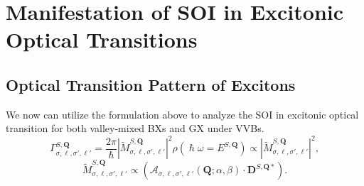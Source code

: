 \section{Manifestation of SOI in Excitonic Optical Transitions}
\subsection{Optical Transition Pattern of Excitons}
We now can utilize the formulation above to analyze the SOI in excitonic optical transition for both valley-mixed BXs and GX under VVBs. 
\begin{equation}
\Gamma_{\sigma, \ell, \sigma', \ell'}^{S, \boldsymbol{Q}}
=
\frac{2\pi}{\hslash} 
\left|
\tilde{M}_{\sigma, \ell, \sigma', \ell'}^{S, \boldsymbol{Q}}
\right|^2
\rho(\hslash\omega=E^{S, \boldsymbol{Q}})
\propto 
\left|
\tilde{M}_{\sigma, \ell, \sigma', \ell'}^{S, \boldsymbol{Q}}
\right|^2,
\end{equation}
\begin{equation}
\tilde{M}_{\sigma, \ell, \sigma', \ell'}^{S, \boldsymbol{Q}}
\propto 
\left(
\boldsymbol{\mathcal{A}}_{\sigma, \ell, \sigma', \ell'}(\boldsymbol{Q};\alpha,\beta)
\cdot 
\boldsymbol{D}^{S, \boldsymbol{Q} *}
\right). 
\end{equation}

